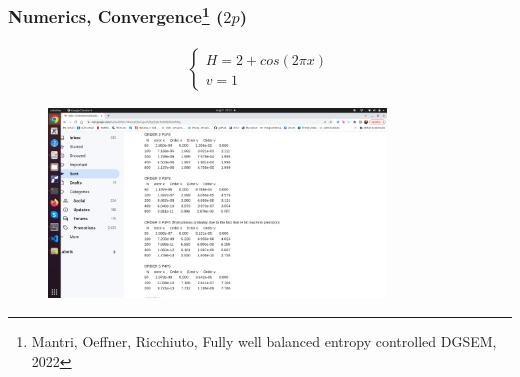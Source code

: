 \documentclass[pt12]{beamer}
\begin{document}
\begin{frame}
\frametitle{Numerics, Convergence\footnote{Mantri, Oeffner, Ricchiuto, Fully well balanced entropy controlled DGSEM, 2022} ($2p$)}

\begin{align}
\begin{cases}
H=2+cos(2\pi x)\\
v=1
\end{cases}
\end{align}



\begin{figure}
     \centering
         \includegraphics[width=0.8\textwidth]{figures/smooth_periodic/conv.png}
\end{figure}


\end{frame}
\end{document}
